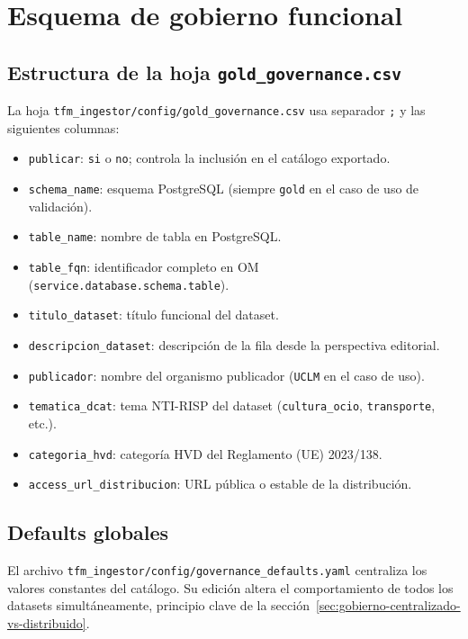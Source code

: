 \chapter{Esquema de gobierno funcional}\label{ap:ingesta-gobierno}

\section{Estructura de la hoja \texttt{gold\_governance.csv}}

La hoja \texttt{tfm\_ingestor/config/gold\_governance.csv} usa separador \texttt{;} y las siguientes columnas:

\begin{itemize}
    \item \texttt{publicar}: \texttt{si} o \texttt{no}; controla la inclusión en el catálogo exportado.
    \item \texttt{schema\_name}: esquema PostgreSQL (siempre \texttt{gold} en el caso de uso de validación).
    \item \texttt{table\_name}: nombre de tabla en PostgreSQL.
    \item \texttt{table\_fqn}: identificador completo en \ac{OM} (\texttt{service.database.schema.table}).
    \item \texttt{titulo\_dataset}: título funcional del dataset.
    \item \texttt{descripcion\_dataset}: descripción de la fila desde la perspectiva editorial.
    \item \texttt{publicador}: nombre del organismo publicador (\texttt{UCLM} en el caso de uso).
    \item \texttt{tematica\_dcat}: tema NTI-RISP del dataset (\texttt{cultura\_ocio}, \texttt{transporte}, etc.).
    \item \texttt{categoria\_hvd}: categoría \ac{HVD} del Reglamento (UE) 2023/138.
    \item \texttt{access\_url\_distribucion}: URL pública o estable de la distribución.
\end{itemize}

\section{Defaults globales}

El archivo \texttt{tfm\_ingestor/config/governance\_defaults.yaml} centraliza los valores constantes del catálogo. Su edición altera el comportamiento de todos los datasets simultáneamente, principio clave de la sección~\ref{sec:gobierno-centralizado-vs-distribuido}.
